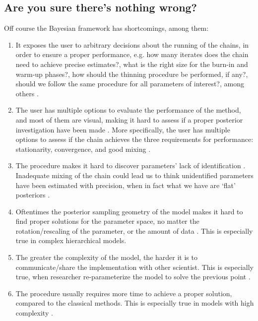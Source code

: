 
\subsection{Are you sure there's nothing wrong?}
Off course the Bayesian framework has shortcomings, among them:

\begin{enumerate}	
	\item It exposes the user to arbitrary decisions about the running of the chains, in order to ensure a proper performance, e.g. how many iterates does the chain need to achieve precise estimates?, what is the right size for the burn-in and warm-up phases?, how should the thinning procedure be performed, if any?, should we follow the same procedure for all parameters of interest?, among others \cite{Skrondal_et_al_2004a}. 
	
	\item The user has multiple options to evaluate the performance of the method, and most of them are visual, making it hard to assess if a proper posterior investigation have been made \cite{Gelman_et_al_1996}. More specifically, the user has multiple options to assess if the chain achieves the three requirements for performance: stationarity, convergence, and good mixing \cite{McElreath_2020}. 
	
	\item The procedure makes it hard to discover parameters' lack of identification \cite{Skrondal_et_al_2004a}. Inadequate mixing of the chain could lead us to think unidentified parameters have been estimated with precision, when in fact what we have are `flat' posteriors \cite{Keane_1992}.
	
	\item Oftentimes the posterior sampling geometry of the model makes it hard to find proper solutions for the parameter space, no matter the rotation/rescaling of the parameter, or the amount of data \cite{Betancourt_et_al_2013}. This is especially true in complex hierarchical models.
	
	\item The greater the complexity of the model, the harder it is to communicate/share the implementation with other scientist. This is especially true, when researcher re-parameterize the model to solve the previous point \cite{McElreath_2020}.
	
	\item The procedure usually requires more time to achieve a proper solution, compared to the classical methods. This is especially true in models with high complexity \cite{Tarazona_2013, Rivera_2019}.
\end{enumerate}

